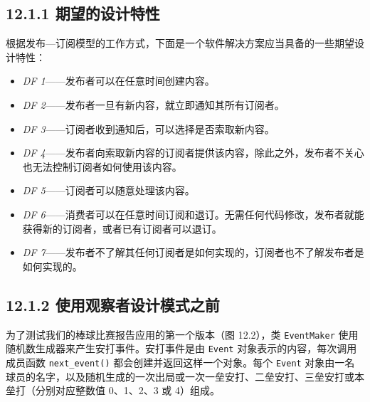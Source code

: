 \subsection{12.1.1 期望的设计特性}

根据发布—订阅模型的工作方式，下面是一个软件解决方案应当具备的一些期望设计特性：

\begin{itemize}
\item \emph{DF 1}——发布者可以在任意时间创建内容。
\item \emph{DF 2}——发布者一旦有新内容，就立即通知其所有订阅者。
\item \emph{DF 3}——订阅者收到通知后，可以选择是否索取新内容。
\item \emph{DF 4}——发布者向索取新内容的订阅者提供该内容，除此之外，发布者不关心也无法控制订阅者如何使用该内容。
\item \emph{DF 5}——订阅者可以随意处理该内容。
\item \emph{DF 6}——消费者可以在任意时间订阅和退订。无需任何代码修改，发布者就能获得新的订阅者，或者已有订阅者可以退订。
\item \emph{DF 7}——发布者不了解其任何订阅者是如何实现的，订阅者也不了解发布者是如何实现的。
\end{itemize}

\subsection{12.1.2 使用观察者设计模式之前}

为了测试我们的棒球比赛报告应用的第一个版本（图 12.2），类 \texttt{Event\allowbreak{}Maker} 使用随机数生成器来产生安打事件。安打事件是由 \texttt{Event} 对象表示的内容，每次调用成员函数 \texttt{next\_\allowbreak{}event(\allowbreak{})\allowbreak{}} 都会创建并返回这样一个对象。每个 \texttt{Event} 对象由一名球员的名字，以及随机生成的一次出局或一次一垒安打、二垒安打、三垒安打或本垒打（分别对应整数值 0、1、2、3 或 4）组成。


